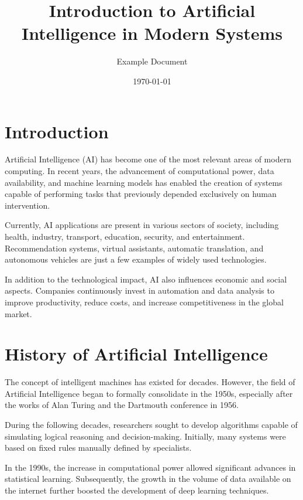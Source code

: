 \documentclass[11pt]{article}
\begin{document}
\title{Introduction to Artificial Intelligence in Modern Systems}
\author{Example Document}
\date{\today}
 
\maketitle

\tableofcontents
   
\newpage  

\section{Introduction}

Artificial Intelligence (AI) has become one of the most relevant areas of modern computing.
In recent years, the advancement of computational power, data availability, and machine
learning models has enabled the creation of systems capable of performing tasks that
previously depended exclusively on human intervention.

Currently, AI applications are present in various sectors of society, including health,
industry, transport, education, security, and entertainment. Recommendation systems,
virtual assistants, automatic translation, and autonomous vehicles are just a few examples
of widely used technologies.

In addition to the technological impact, AI also influences economic and social aspects. Companies
continuously invest in automation and data analysis to improve productivity,
reduce costs, and increase competitiveness in the global market. 

\section{History of Artificial Intelligence}

The concept of intelligent machines has existed for decades. However, the field of Artificial
Intelligence began to formally consolidate in the 1950s, especially after the works of Alan
Turing and the Dartmouth conference in 1956.

During the following decades, researchers sought to develop algorithms capable of
simulating logical reasoning and decision-making. Initially, many systems were based on
fixed rules manually defined by specialists.

In the 1990s, the increase in computational power allowed significant advances in
statistical learning. Subsequently, the growth in the volume of data available on the
internet further boosted the development of deep learning techniques.
\end{document}
